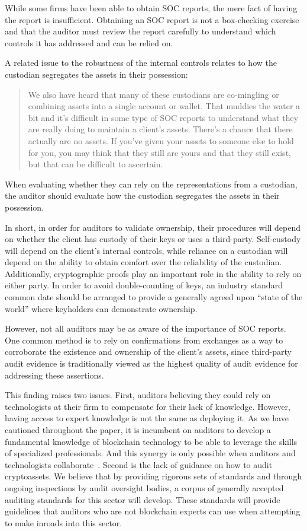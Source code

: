 While some firms have been able to obtain SOC reports, the mere fact of having the report is insufficient. Obtaining an SOC report is not a box-checking exercise and that the auditor must review the report carefully to understand which controls it has addressed and can be relied on.

A related issue to the robustness of the internal controls relates to how the custodian segregates the assets in their possession: 

\begin{quote}
We also have heard that many of these custodians are co-mingling or combining assets into a single account or wallet. That muddies the water a bit and it's difficult in some type of SOC reports to understand what they are really doing to maintain a client's assets. There's a chance that there actually are no assets. If you've given your assets to someone else to hold for you, you may think that they still are yours and that they still exist, but that can be difficult to ascertain.
\end{quote}

When evaluating whether they can rely on the representations from a custodian, the auditor should evaluate how the custodian segregates the assets in their possession. 

In short, in order for auditors to validate ownership, their procedures will depend on whether the client has custody of their keys or uses a third-party. Self-custody will depend on the client's internal controls, while reliance on a custodian will depend on the ability to obtain comfort over the reliability of the custodian. Additionally, cryptographic proofs play an important role in the ability to rely on either party. In order to avoid double-counting of keys, an industry standard common date should be arranged to provide a generally agreed upon ``state of the world'' where keyholders can demonstrate ownership. 

However, not all auditors may be as aware of the importance of SOC reports. One common method is to rely on confirmations from exchanges as a way to corroborate the existence and ownership of the client's assets, since third-party audit evidence is traditionally viewed as the highest quality of audit evidence for addressing these assertions. 

This finding raises two issues. First, auditors believing they could rely on technologists at their firm to compensate for their lack of knowledge. However, having access to expert knowledge is not the same as deploying it. As we have cautioned throughout the paper, it is incumbent on auditors to develop a fundamental knowledge of blockchain technology to be able to leverage the skills of specialized professionals. And this synergy is only possible when auditors and technologists collaborate~\cite{bauer2019one}. Second is the lack of guidance on how to audit cryptoassets. We believe that by providing rigorous sets of standards and through ongoing inspections by audit oversight bodies, a corpus of generally accepted auditing standards for this sector will develop. These standards will provide guidelines that auditors who are not blockchain experts can use when attempting to make inroads into this sector. 




